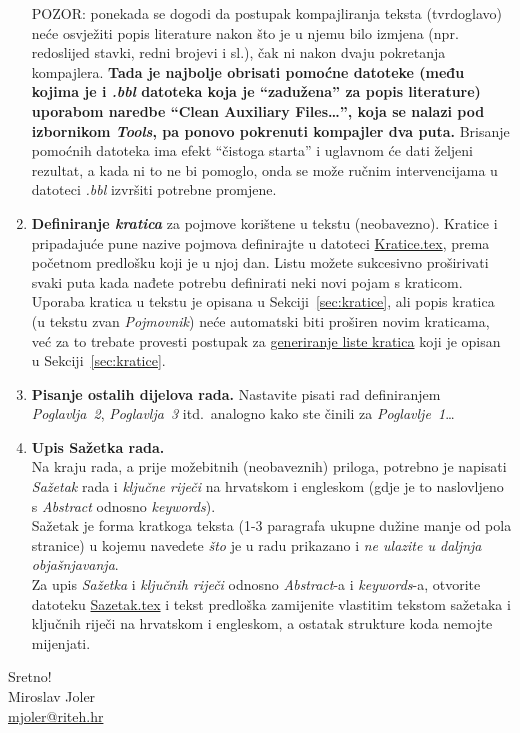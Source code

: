 \begin{enumerate}
	{\color{red} POZOR: ponekada se dogodi da postupak kompajliranja teksta (tvrdoglavo) neće osvježiti popis literature nakon što je u njemu bilo izmjena (npr. redoslijed stavki, redni brojevi i sl.), čak ni nakon dvaju pokretanja kompajlera. \textbf{Tada je najbolje obrisati pomoćne datoteke (među kojima je i \emph{.bbl} datoteka koja je ``zadužena'' za popis literature) uporabom naredbe ``Clean Auxiliary Files\dots'', koja se nalazi pod izbornikom \emph{Tools}, pa ponovo pokrenuti kompajler dva puta.}} Brisanje pomoćnih datoteka ima efekt ``čistoga starta'' i uglavnom će dati željeni rezultat, a kada ni to ne bi pomoglo, onda se može ručnim intervencijama u datoteci \emph{.bbl} izvršiti potrebne promjene.
	\item {\color{red} \textbf{Definiranje \emph{kratica}}} za pojmove korištene u tekstu (neobavezno). Kratice i pripadajuće pune nazive pojmova definirajte u datoteci \href{run:Kratice.tex}{{\color{blue}Kratice.tex}}, prema početnom predlošku koji je u njoj dan. Listu možete sukcesivno proširivati svaki puta kada nađete potrebu definirati neki novi pojam s kraticom.\\
	Uporaba kratica u tekstu je opisana u Sekciji~\ref{sec:kratice}, ali popis kratica (u tekstu zvan \emph{Pojmovnik}) neće automatski biti proširen novim kraticama, već za to trebate provesti postupak za \hyperref[generiranje_liste_kratica]{{\color{blue} generiranje liste kratica}} koji je opisan u Sekciji~\ref{sec:kratice}.
	\item {\color{red} \textbf{Pisanje ostalih dijelova rada.}} Nastavite pisati rad definiranjem \emph{Poglavlja~2}, \emph{Poglavlja~3} itd.\, analogno kako ste činili za \emph{Poglavlje~1}\dots
	\item {\color{red} \textbf{Upis Sažetka rada.}}\\
	Na kraju rada, a prije možebitnih (neobaveznih) priloga, potrebno je napisati \emph{Sažetak} rada i \emph{ključne riječi} na hrvatskom i engleskom (gdje je to naslovljeno s \emph{Abstract} odnosno \emph{keywords}). \\
	Sažetak je forma kratkoga teksta (1-3 paragrafa ukupne dužine manje od pola stranice) u kojemu navedete \emph{što} je u radu prikazano i \emph{ne ulazite u daljnja objašnjavanja}.\\
	Za upis \emph{Sažetka} i \emph{ključnih riječi} odnosno \emph{Abstract}-a i \emph{keywords}-a, otvorite datoteku \href{Sazetak.tex}{{\color{blue}Sazetak.tex}} i tekst predloška zamijenite vlastitim tekstom sažetaka i ključnih riječi na hrvatskom i engleskom, a ostatak strukture koda nemojte mijenjati.
\end{enumerate}

\vspace{10pt}

\begin{flushright}
	Sretno! \\
	Miroslav Joler \\
	\href{mailto:mjoler@riteh.hr}{mjoler@riteh.hr}
\end{flushright}

